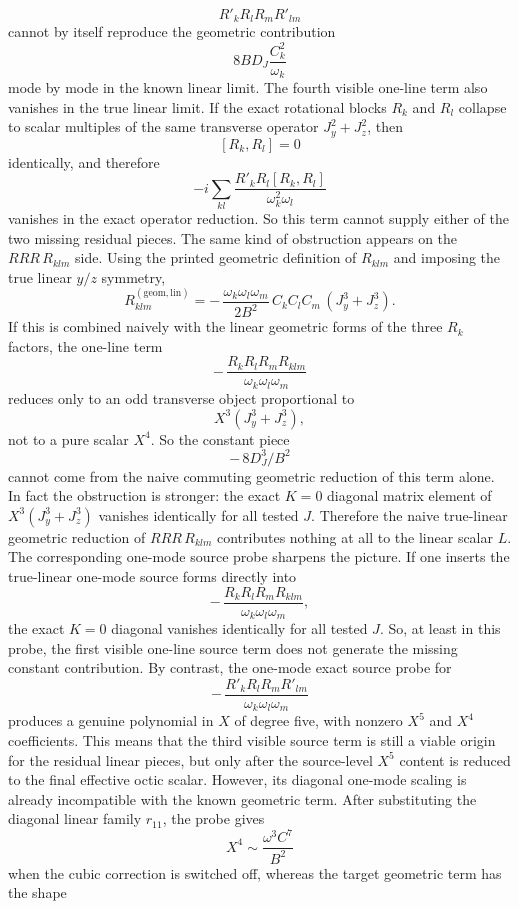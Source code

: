 \documentclass[aip,jcp,reprint,floatfix]{revtex4-2}
\begin{document}
\[
R'_kR_lR_mR'_{lm}
\]
cannot by itself reproduce the geometric contribution
\[
8BD_J\frac{C_k^2}{\omega_k}
\]
mode by mode in the known linear limit.
The fourth visible one-line term also vanishes in the true linear limit. If
the exact rotational blocks \(R_k\) and \(R_l\) collapse to scalar multiples of
the same transverse operator \(J_y^2+J_z^2\), then
\[
[R_k,R_l]=0
\]
identically, and therefore
\[
-i\sum_{kl}\frac{R'_kR_l[R_k,R_l]}{\omega_k^2\omega_l}
\]
vanishes in the exact operator reduction. So this term cannot supply either of
the two missing residual pieces.
The same kind of obstruction appears on the \(RRR\,R_{klm}\) side. Using the
printed geometric definition of \(R_{klm}\) and imposing the true linear
\(y/z\) symmetry,
\[
R_{klm}^{(\mathrm{geom,lin})}
=
-\,\frac{\omega_k\omega_l\omega_m}{2B^2}\,C_kC_lC_m\,(J_y^3+J_z^3).
\]
If this is combined naively with the linear geometric forms of the three
\(R_k\) factors, the one-line term
\[
-\,\frac{R_kR_lR_mR_{klm}}{\omega_k\omega_l\omega_m}
\]
reduces only to an odd transverse object proportional to
\[
X^3(J_y^3+J_z^3),
\]
not to a pure scalar \(X^4\). So the constant piece
\[
-\,8D_J^3/B^2
\]
cannot come from the naive commuting geometric reduction of this term alone.
In fact the obstruction is stronger: the exact \(K=0\) diagonal matrix element
of \(X^3(J_y^3+J_z^3)\) vanishes identically for all tested \(J\). Therefore
the naive true-linear geometric reduction of \(RRR\,R_{klm}\) contributes
nothing at all to the linear scalar \(L\).
The corresponding one-mode source probe sharpens the picture. If one inserts
the true-linear one-mode source forms directly into
\[
-\,\frac{R_kR_lR_mR_{klm}}{\omega_k\omega_l\omega_m},
\]
the exact \(K=0\) diagonal vanishes identically for all tested \(J\). So, at
least in this probe, the first visible one-line source term does not generate
the missing constant contribution.
By contrast, the one-mode exact source probe for
\[
-\,\frac{R'_kR_lR_mR'_{lm}}{\omega_k\omega_l\omega_m}
\]
produces a genuine polynomial in \(X\) of degree five, with nonzero \(X^5\)
and \(X^4\) coefficients. This means that the third visible source term is
still a viable origin for the residual linear pieces, but only after the
source-level \(X^5\) content is reduced to the final effective octic scalar.
However, its diagonal one-mode scaling is already incompatible with the known
geometric term. After substituting the diagonal linear family \(r_{11}\), the
probe gives
\[
X^4 \sim \frac{\omega^3 C^7}{B^2}
\]
when the cubic correction is switched off, whereas the target geometric term
has the shape
\end{document}
